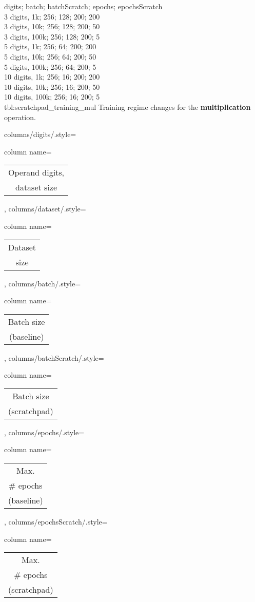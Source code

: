 {
	digits; batch; batchScratch; epochs; epochsScratch\\
	3 digits,  1k;  256; 128; 200; 200\\
	3 digits,  10k;  256; 128; 200; 50\\
	3 digits,  100k;  256; 128; 200; 5\\
	5 digits,  1k;  256; 64; 200; 200\\
	5 digits,  10k;  256; 64; 200; 50\\
	5 digits,  100k;  256; 64; 200; 5\\
	10 digits,  1k;  256; 16; 200; 200\\
	10 digits,  10k;  256; 16; 200; 50\\
	10 digits,  100k;  256; 16; 200; 5\\
}
{tbl:scratchpad_training_mul}
{
	Training regime changes for the \textbf{multiplication} operation.
}
{%
	columns/digits/.style={column name={\begin{tabular}{c}
				Operand digits, \\
				dataset size
	\end{tabular}}},
	columns/dataset/.style={column name={\begin{tabular}{c}
				Dataset \\
				size
	\end{tabular}}},
	columns/batch/.style={column name={\begin{tabular}{c}
				Batch size \\
				(baseline)
	\end{tabular}}},
	columns/batchScratch/.style={column name={\begin{tabular}{c}
				Batch size \\
				(scratchpad)
	\end{tabular}}},
	columns/epochs/.style={column name={\begin{tabular}{c}
				Max. \\
				\# epochs \\
				(baseline)
	\end{tabular}}},
	columns/epochsScratch/.style={column name={\begin{tabular}{c}
				Max. \\
				\# epochs \\
				(scratchpad)
	\end{tabular}}}
}

